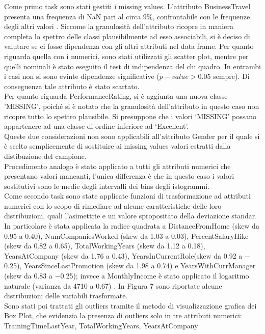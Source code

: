 \documentclass[a4paper,9pt]{article}
\begin{document}
Come primo task sono stati gestiti i missing values.
L'attributo BusinessTravel presenta una frequenza di NaN pari al circa $9\%$, confrontabile con le frequenze degli altri valori . Siccome la granulosità dell'attributo ricopre in maniera completa lo spettro delle classi plausibilmente ad esso associabili, si è deciso di valutare se ci fosse dipendenza con gli altri attributi nel data frame. Per quanto riguarda quella con i numerici, sono stati utilizzati gli scatter plot, mentre per quelli nominali è stato eseguito il test di indipendenza del chi quadro. In entrambi i casi non si sono evinte dipendenze significative ($p-value > 0.05$ sempre). Di conseguenza tale attributo è stato scartato.\\
Per quanto riguarda PerformanceRating, si è aggiunta una nuova classe 'MISSING', poiché si è notato che la granulosità dell'attributo in questo caso non ricopre tutto lo spettro plausibile. Si presuppone che i valori `MISSING' possano appartenere ad una classe di ordine inferiore ad `Excellent'.\\
Queste due considerazioni non sono applicabili all'attributo Gender per il quale si è scelto semplicemente di sostituire ai missing values valori estratti dalla distibuzione del campione.\\
Procedimento analogo è stato applicato a tutti gli attributi numerici che presentano valori mancanti, l'unica differenza è che in questo caso i valori sostitutivi sono le medie degli intervalli dei bins degli istogrammi.\\ %
Come secondo task sono state applicate funzioni di trasformazione ad attributi numerici con lo scopo di rimediare ad alcune caratteristiche delle loro distribuzioni, quali l'asimettrie e un valore spropositato della deviazione standar. In particolare è stata applicata la radice quadrata a DistanceFromHome (skew da 0.95 a 0.40), NumCompaniesWorked (skew da 1.03 a 0.03), PercentSalaryHike (skew da 0.82 a 0.65), TotalWorkingYears (skew da 1.12 a 0.18), YearsAtCompany (skew da 1.76 a 0.43), YearsInCurrentRole(skew da 0.92 a $-$0.25), YearsSinceLastPromotion (skew da 1.98 a 0.74) e YearsWithCurrManager (skew da 0.83 a $-$0.25); invece a MonthlyIncome è stato applicato il logaritmo naturale (varianza da 4710 a 0.67) . In Figura 7 sono riportate alcune distribuzioni delle variabili trasformate.\\
Sono stati poi trattati gli outliers tramite il metodo di visualizzazione grafica dei Box Plot, che evidenzia la presenza di outliers solo in tre attributi numerici: TrainingTimeLastYear, TotalWorkingYears, YearsAtCompany
\end{document}
